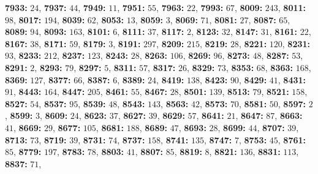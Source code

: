 \textsf{\bfseries 7933:} $24$, \textsf{\bfseries 7937:} $44$, \textsf{\bfseries 7949:} $11$, \textsf{\bfseries 7951:} $55$, \textsf{\bfseries 7963:} $22$, \textsf{\bfseries 7993:} $67$, \textsf{\bfseries 8009:} $243$, \textsf{\bfseries 8011:} $98$, \textsf{\bfseries 8017:} $194$, \textsf{\bfseries 8039:} $62$, \textsf{\bfseries 8053:} $13$, \textsf{\bfseries 8059:} $3$, \textsf{\bfseries 8069:} $71$, \textsf{\bfseries 8081:} $27$, \textsf{\bfseries 8087:} $65$, \textsf{\bfseries 8089:} $94$, \textsf{\bfseries 8093:} $163$, \textsf{\bfseries 8101:} $6$, \textsf{\bfseries 8111:} $37$, \textsf{\bfseries 8117:} $2$, \textsf{\bfseries 8123:} $32$, \textsf{\bfseries 8147:} $31$, \textsf{\bfseries 8161:} $22$, \textsf{\bfseries 8167:} $38$, \textsf{\bfseries 8171:} $59$, \textsf{\bfseries 8179:} $3$, \textsf{\bfseries 8191:} $297$, \textsf{\bfseries 8209:} $215$, \textsf{\bfseries 8219:} $28$, \textsf{\bfseries 8221:} $120$, \textsf{\bfseries 8231:} $93$, \textsf{\bfseries 8233:} $212$, \textsf{\bfseries 8237:} $123$, \textsf{\bfseries 8243:} $28$, \textsf{\bfseries 8263:} $106$, \textsf{\bfseries 8269:} $96$, \textsf{\bfseries 8273:} $48$, \textsf{\bfseries 8287:} $53$, \textsf{\bfseries 8291:} $2$, \textsf{\bfseries 8293:} $79$, \textsf{\bfseries 8297:} $5$, \textsf{\bfseries 8311:} $57$, \textsf{\bfseries 8317:} $26$, \textsf{\bfseries 8329:} $73$, \textsf{\bfseries 8353:} $68$, \textsf{\bfseries 8363:} $168$, \textsf{\bfseries 8369:} $127$, \textsf{\bfseries 8377:} $66$, \textsf{\bfseries 8387:} $6$, \textsf{\bfseries 8389:} $24$, \textsf{\bfseries 8419:} $138$, \textsf{\bfseries 8423:} $90$, \textsf{\bfseries 8429:} $41$, \textsf{\bfseries 8431:} $91$, \textsf{\bfseries 8443:} $164$, \textsf{\bfseries 8447:} $205$, \textsf{\bfseries 8461:} $55$, \textsf{\bfseries 8467:} $28$, \textsf{\bfseries 8501:} $139$, \textsf{\bfseries 8513:} $79$, \textsf{\bfseries 8521:} $158$, \textsf{\bfseries 8527:} $54$, \textsf{\bfseries 8537:} $95$, \textsf{\bfseries 8539:} $48$, \textsf{\bfseries 8543:} $143$, \textsf{\bfseries 8563:} $42$, \textsf{\bfseries 8573:} $70$, \textsf{\bfseries 8581:} $50$, \textsf{\bfseries 8597:} $2$, \textsf{\bfseries 8599:} $3$, \textsf{\bfseries 8609:} $24$, \textsf{\bfseries 8623:} $37$, \textsf{\bfseries 8627:} $39$, \textsf{\bfseries 8629:} $57$, \textsf{\bfseries 8641:} $21$, \textsf{\bfseries 8647:} $87$, \textsf{\bfseries 8663:} $41$, \textsf{\bfseries 8669:} $29$, \textsf{\bfseries 8677:} $105$, \textsf{\bfseries 8681:} $188$, \textsf{\bfseries 8689:} $47$, \textsf{\bfseries 8693:} $28$, \textsf{\bfseries 8699:} $44$, \textsf{\bfseries 8707:} $39$, \textsf{\bfseries 8713:} $73$, \textsf{\bfseries 8719:} $39$, \textsf{\bfseries 8731:} $74$, \textsf{\bfseries 8737:} $158$, \textsf{\bfseries 8741:} $135$, \textsf{\bfseries 8747:} $7$, \textsf{\bfseries 8753:} $45$, \textsf{\bfseries 8761:} $85$, \textsf{\bfseries 8779:} $197$, \textsf{\bfseries 8783:} $78$, \textsf{\bfseries 8803:} $41$, \textsf{\bfseries 8807:} $85$, \textsf{\bfseries 8819:} $8$, \textsf{\bfseries 8821:} $136$, \textsf{\bfseries 8831:} $113$, \textsf{\bfseries 8837:} $71$, 
